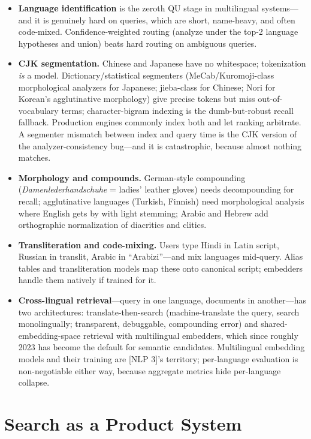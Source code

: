 \begin{itemize}
    \item \textbf{Language identification} is the zeroth QU stage in multilingual systems---and it is genuinely hard on queries, which are short, name-heavy, and often code-mixed. Confidence-weighted routing (analyze under the top-2 language hypotheses and union) beats hard routing on ambiguous queries.
    \item \textbf{CJK segmentation.} Chinese and Japanese have no whitespace; tokenization \textit{is} a model. Dictionary/statistical segmenters (MeCab/Kuromoji-class morphological analyzers for Japanese; jieba-class for Chinese; Nori for Korean's agglutinative morphology) give precise tokens but miss out-of-vocabulary terms; character-bigram indexing is the dumb-but-robust recall fallback. Production engines commonly index both and let ranking arbitrate. A segmenter mismatch between index and query time is the CJK version of the analyzer-consistency bug---and it is catastrophic, because almost nothing matches.
    \item \textbf{Morphology and compounds.} German-style compounding (\textit{Damenlederhandschuhe} = ladies' leather gloves) needs decompounding for recall; agglutinative languages (Turkish, Finnish) need morphological analysis where English gets by with light stemming; Arabic and Hebrew add orthographic normalization of diacritics and clitics.
    \item \textbf{Transliteration and code-mixing.} Users type Hindi in Latin script, Russian in translit, Arabic in ``Arabizi''---and mix languages mid-query. Alias tables and transliteration models map these onto canonical script; embedders handle them natively if trained for it.
    \item \textbf{Cross-lingual retrieval}---query in one language, documents in another---has two architectures: translate-then-search (machine-translate the query, search monolingually; transparent, debuggable, compounding error) and shared-embedding-space retrieval with multilingual embedders, which since roughly 2023 has become the default for semantic candidates. Multilingual embedding models and their training are [NLP 3]'s territory; per-language evaluation is non-negotiable either way, because aggregate metrics hide per-language collapse.
\end{itemize}

\section{Search as a Product System}
\label{sr:sec:search_product_system}

